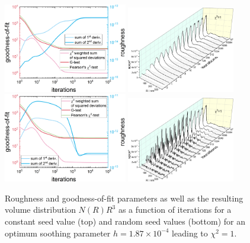 \begin{figure}[htb]
\centering
\includegraphics[width=0.48\textwidth]{../images/form_factor/EM/EMconstant_seed_smooth_0_000187_goodness_of_fit.png}
\hspace{0.06\textwidth}
\includegraphics[width=0.42\textwidth]{../images/form_factor/EM/EMconstant_seed_smooth_0_000187_NR.png}
\includegraphics[width=0.48\textwidth]{../images/form_factor/EM/EMrandom_seed_smooth_0_000187_goodness_of_fit.png}
\hspace{0.06\textwidth}
\includegraphics[width=0.42\textwidth]{../images/form_factor/EM/EMrandom_seed_smooth_0_000187_NR.png}
\caption{Roughness and goodness-of-fit parameters as well as the resulting volume distribution $N(R)R^3$ as a function of iterations for  a constant seed value (top) and random seed values (bottom) for an optimum soothing parameter $h=1.87\times 10^{-4}$ leading to $\chi^2=1$.\label{fig:EMhoptimum}}
\end{figure}

